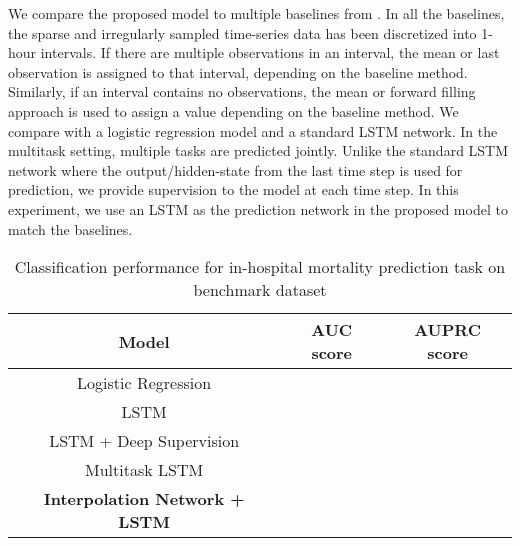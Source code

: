 \documentclass{article} \usepackage{iclr2019_conference,times}
\begin{document}
We compare the proposed model to multiple baselines from \cite{benchmark}. In all the baselines, the sparse and irregularly sampled time-series data has been discretized into 1-hour intervals. If there are multiple observations in an interval, the mean or last observation is assigned to that interval, depending on the baseline  method. Similarly, if an interval contains no observations, the  mean or forward filling approach is used to assign a value depending on the baseline method. We compare with a logistic regression model and a standard LSTM network. In the multitask setting, multiple tasks are predicted jointly. Unlike the standard LSTM network where the output/hidden-state from the last time step is used for prediction, we provide supervision to the model at each time step. In this experiment, we use an LSTM as the prediction network in the proposed model to match the baselines. 

\begin{table}[h]
\caption{Classification performance for in-hospital mortality prediction task on benchmark dataset}
\begin{center}
\begin{tabular}{ c c c} 
 \toprule
 {\bf Model} & {\bf AUC score} & {\bf AUPRC score}\\
 \midrule
 Logistic Regression &  &  \\
 LSTM &  &  \\
 LSTM + Deep Supervision &  &  \\
 Multitask LSTM &  &  \\ 
 {\bf Interpolation Network + LSTM} &  & \\
 \bottomrule
 \end{tabular}
\end{center}
\label{table:benchmark}
\end{table}



 



 
\end{document}
